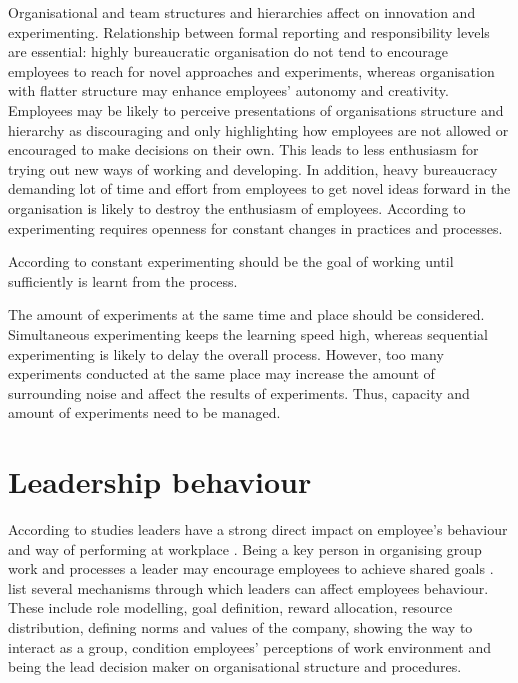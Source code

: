 Organisational and team structures and hierarchies affect on innovation and experimenting. Relationship between formal reporting and responsibility levels are essential: highly bureaucratic organisation do not tend to encourage employees to reach for novel approaches and experiments, whereas organisation with flatter structure may enhance employees' autonomy and creativity. Employees may be likely to perceive presentations of organisations structure and hierarchy as discouraging and only highlighting how employees are not allowed or encouraged to make decisions on their own. This leads to less enthusiasm for trying out new ways of working and developing. In addition, heavy bureaucracy demanding lot of time and effort from employees to get novel ideas forward in the organisation is likely to destroy the enthusiasm of employees. \citep{shalley2004leaders} According to \citet{thomke2003r} experimenting requires openness for constant changes in practices and processes.

According to \citet{amabile2008creativity} constant experimenting should be the goal of working until sufficiently is learnt from the process. 

The amount of experiments at the same time and place should be considered. Simultaneous experimenting keeps the learning speed high, whereas sequential experimenting is likely to delay the overall process. However, too many experiments conducted at the same place may increase the amount of surrounding noise and affect the results of experiments. Thus, capacity and amount of experiments need to be managed. \citep{thomke2003r}


\section{Leadership behaviour}
According to studies leaders have a strong direct impact on employee's behaviour and way of performing at workplace \citep{katz1978social,redmond1993putting}. Being a key person in organising group work and processes a leader may encourage employees to achieve shared goals \citep{amabile1998kill}. \citet{avolio1988transformational} list several mechanisms through which leaders can affect employees behaviour. These include role modelling, goal definition, reward allocation, resource distribution, defining norms and values of the company, showing the way to interact as a group, condition employees' perceptions of work environment and being the lead decision maker on organisational structure and procedures.

